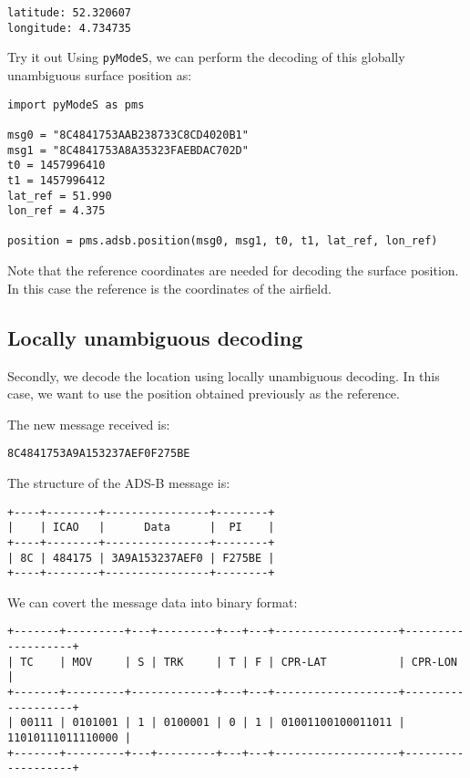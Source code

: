 \begin{verbatim}
latitude: 52.320607
longitude: 4.734735
\end{verbatim}

\begin{notebox}{Try it out}
Using \texttt{pyModeS}, we can perform the decoding of this globally unambiguous surface position as: 

\begin{verbatim}
import pyModeS as pms

msg0 = "8C4841753AAB238733C8CD4020B1"
msg1 = "8C4841753A8A35323FAEBDAC702D"
t0 = 1457996410
t1 = 1457996412
lat_ref = 51.990
lon_ref = 4.375

position = pms.adsb.position(msg0, msg1, t0, t1, lat_ref, lon_ref)
\end{verbatim}

Note that the reference coordinates are needed for decoding the surface position. In this case the reference is the coordinates of the airfield. 

\end{notebox}



\subsection{Locally unambiguous decoding}

Secondly, we decode the location using locally unambiguous decoding. In this case, we want to use the position obtained previously as the reference.

The new message received is:

\begin{verbatim}
8C4841753A9A153237AEF0F275BE
\end{verbatim}

The structure of the ADS-B message is:

\begin{verbatim}
+----+--------+----------------+--------+
|    | ICAO   |      Data      |  PI    |
+----+--------+----------------+--------+
| 8C | 484175 | 3A9A153237AEF0 | F275BE |
+----+--------+----------------+--------+
\end{verbatim}

We can covert the message data into binary format:

\begin{verbatim}
+-------+---------+---+---------+---+---+-------------------+-------------------+
| TC    | MOV     | S | TRK     | T | F | CPR-LAT           | CPR-LON           |
+-------+---------+-------------+---+---+-------------------+-------------------+
| 00111 | 0101001 | 1 | 0100001 | 0 | 1 | 01001100100011011 | 11010111011110000 |
+-------+---------+---+---------+---+---+-------------------+-------------------+
\end{verbatim}


